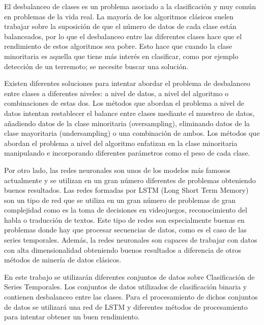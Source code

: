 El desbalanceo de clases es un problema asociado a la clasificación y muy común en problemas de la vida real. La mayoría de los algoritmos clásicos suelen trabajar sobre la suposición de que el número de datos de cada clase están balanceados, por lo que el desbalanceo entre las diferentes clases hace que el rendimiento de estos algoritmos sea pobre. Esto hace que cuando la clase minoritaria es aquella que tiene más interés en clasificar, como por ejemplo detección de un terremoto; se necesite buscar una solución.\newline

Existen diferentes soluciones para intentar abordar el problema de desbalanceo entre clases a diferentes niveles: a nivel de datos, a nivel del algoritmo o combinaciones de estas dos. Los métodos que abordan el problema a nivel de datos intentan restablecer el balance entre clases mediante el muestreo de datos, añadiendo datos de la clase minoritaria (oversampling), eliminando datos de la clase mayoritaria (undersampling) o una combinación de ambos. Los métodos que abordan el problema a nivel del algoritmo enfatizan en la clase minoritaria manipulando e incorporando diferentes parámetros como el peso de cada clase.\newline

Por otro lado, las redes neuronales son unos de los modelos más famosos actualmente \cite{chung2015gated} \cite{cho2014properties} \cite{karim2017lstm} \cite{swapna2018automated} y se utilizan en un gran número diferentes de problemas obteniendo buenos resultados. Las redes formadas por LSTM (Long Short Term Memory) son un tipo de red que se utiliza en un gran número de problemas de gran complejidad como es la toma de decisiones en videojuegos, reconocimiento del habla o traducción de textos. Este tipo de redes son especialmente buenas en problemas donde hay que procesar secuencias de datos, como  es el caso de las series temporales. Además, la redes neuronales son capaces de trabajar con datos con alta dimensionalidad obteniendo buenos resultados a diferencia de otros métodos de minería de datos clásicos.\newline

En este trabajo se utilizarán diferentes conjuntos de datos sobre Clasificación de Series Temporales. Los conjuntos de datos utilizados de clasificación binaria y contienen desbalanceo entre las clases. Para el procesamiento de dichos conjuntos de datos se utilizará una red de LSTM y diferentes métodos de procesamiento para intentar obtener un buen rendimiento.\newline

